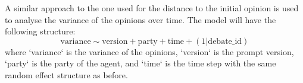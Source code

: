 \documentclass[12pt]{article}
\begin{document}
A similar approach to the one used for the distance to the initial opinion is used to analyse the variance of the opinions over time. The model will have the following structure:
\begin{equation}
    \text{variance} \sim \text{version} + \text{party}+ \text{time} + (1 | \text{debate\_id})
\end{equation}
where `variance` is the variance of the opinions, `version` is the prompt version, `party` is the party of the agent, and `time` is the time step with the same random effect structure as before.




\end{document}
